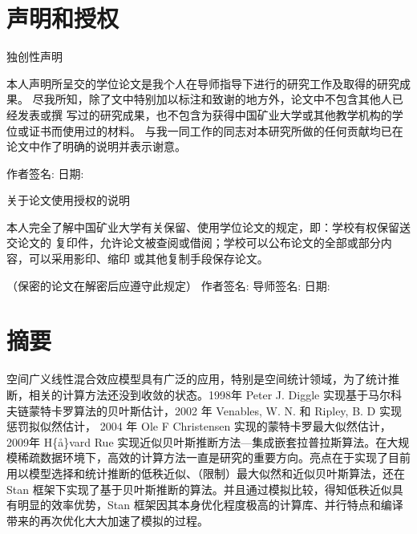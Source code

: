 \documentclass[hyperref, a4paper, UTF8, zihao = -4, linespread = 1.3, table,
notitlepage]{book}
\begin{document}
\newpage 
\thispagestyle{empty}
\mbox{}
\newpage

\hypertarget{declaration}{%
\chapter*{声明和授权}\label{declaration}}


\thispagestyle{empty}
\vskip 10mm

\begin{center}
\heiti{}独创性声明
\end{center}
\vskip 5mm
\par

本人声明所呈交的学位论文是我个人在导师指导下进行的研究工作及取得的研究成果。
尽我所知，除了文中特别加以标注和致谢的地方外，论文中不包含其他人已经发表或撰
写过的研究成果，也不包含为获得中国矿业大学或其他教学机构的学位或证书而使用过的材料。
与我一同工作的同志对本研究所做的任何贡献均已在论文中作了明确的说明并表示谢意。

\vskip 5mm
\hspace{55mm}

作者签名:\underline{\makebox[0.15\textwidth][c]{}}
日期:\underline{\makebox[0.15\textwidth][c]{}} \vskip3mm

\vspace{5.0cm}

\begin{center}
\heiti{}关于论文使用授权的说明
\end{center}
\vskip 5mm
\par

本人完全了解中国矿业大学有关保留、使用学位论文的规定，即：学校有权保留送交论文的
复印件，允许论文被查阅或借阅；学校可以公布论文的全部或部分内容，可以采用影印、缩印
或其他复制手段保存论文。

\indent（保密的论文在解密后应遵守此规定） \vskip 12mm
\hspace{20mm}作者签名:\underline{\makebox[0.15\textwidth][c]{}}
导师签名:\underline{\makebox[0.15\textwidth][c]{}}
日期:\underline{\makebox[0.15\textwidth][c]{}} \vskip3mm

\newpage
\thispagestyle{empty}
\mbox{}
\newpage

\hypertarget{abstract}{%
\chapter*{摘要}\label{abstract}}


\medskip

空间广义线性混合效应模型具有广泛的应用，特别是空间统计领域，为了统计推断，相关的计算方法还没到收敛的状态。1998年
Peter J. Diggle 实现基于马尔科夫链蒙特卡罗算法的贝叶斯估计，2002 年
Venables, W. N. 和 Ripley, B. D 实现惩罚拟似然估计， 2004 年 Ole F
Christensen 实现的蒙特卡罗最大似然估计，2009年 H\{\aa\}vard Rue
实现近似贝叶斯推断方法---集成嵌套拉普拉斯算法。在大规模稀疏数据环境下，高效的计算方法一直是研究的重要方向。亮点在于实现了目前用以模型选择和统计推断的低秩近似、（限制）最大似然和近似贝叶斯算法，还在
Stan
框架下实现了基于贝叶斯推断的算法。并且通过模拟比较，得知低秩近似具有明显的效率优势，Stan
框架因其本身优化程度极高的计算库、并行特点和编译带来的再次优化大大加速了模拟的过程。
\medskip
\end{document}
